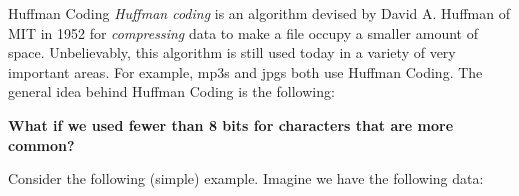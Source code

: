 \documentclass[programming]{../../mfcs}
\begin{document}
\vspace{-1em}

\begin{question}{Huffman Coding}
    \emph{Huffman coding} is an algorithm devised by David A. Huffman of MIT in 1952 for
    \emph{compressing} data to make a file occupy a smaller amount of space.  Unbelievably,
    this algorithm is still used today in a variety of very important areas.  For example,
    mp3s and jpgs both use Huffman Coding. The general idea behind Huffman Coding is the
    following:
    \begin{center}
        \textbf{What if we used fewer than 8 bits for characters that are more common?}
    \end{center}\vspace*{-0.7em}

    Consider the following (simple) example.  Imagine we have the following
    data:\vspace{-0.8em}

    {\begin{center}
    \end{center}}\vspace{-0.8em}


\end{question}
\end{document}
